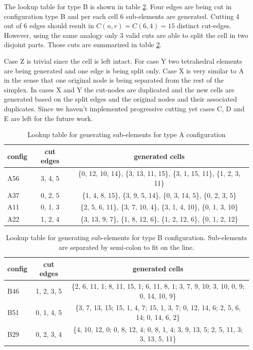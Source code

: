 The lookup table for type B is shown in table \ref{table:lutcutB}. Four edges are being cut in configuration type B and per each cell 6 sub-elements are generated.
Cutting 4 out of 6 edges should result in $C(n, r) = C(6, 4) = 15$ distinct cut-edges. However, using the same analogy only 3 valid cuts are able to split the cell 
in two disjoint parts. Those cuts are summarized in table \ref{table:lutcutB}. 

Case Z is trivial since the cell is left intact. For case Y two tetrahedral elements are being generated and one edge is being split only. Case X is very similar to
A in the sense that one original node is being separated from the rest of the simplex. In cases X and Y the cut-nodes are duplicated and the new cells are generated based
on the split edges and the original nodes and their associated duplicates. Since we haven't implemented progressive cutting yet cases C, D and E are left for the future work.

\begin{table}[H]
\begin{center}
\caption{\label{table:lutcutA}{Lookup table for generating sub-elements for type A configuration}}
  \begin{tabular}{ | l | c | c | }
    \hline    
    config & cut edges & generated cells \\ \hline \hline    
    A56 & 3, 4, 5 & \{0, 12, 10, 14\}, \{3, 13, 11, 15\}, \{3, 1, 15, 11\}, \{1, 2, 3, 11\} \\ \hline
    A37 & 0, 2, 5 & \{1, 4, 8, 15\}, \{3, 9, 5, 14\}, \{0, 3, 14, 5\}, \{0, 2, 3, 5\} \\ \hline
    A11 & 0, 1, 3 & \{2, 5, 6, 11\}, \{3, 7, 10, 4\}, \{3, 1, 4, 10\}, \{0, 1, 3, 10\} \\ \hline
    A22 & 1, 2, 4 & \{3, 13, 9, 7\}, \{1, 8, 12, 6\}, \{1, 2, 12, 6\}, \{0, 1, 2, 12\} \\ \hline
    \hline
  \end{tabular}
\end{center}
\end{table}

\begin{table}[H]
\begin{center}
\caption{\label{table:lutcutB}{Lookup table for generating sub-elements for type B configuration. 
Sub-elements are separated by semi-colon to fit on the line.}}
  \begin{tabular}{ | l | c | c | }
    \hline    
    config & cut edges & generated cells \\ \hline \hline    
    B46 & 1, 2, 3, 5 & \{2, 6, 11, 1; 8, 11, 15, 1; 6, 11, 8, 1; 3, 7, 9, 10; 3, 10, 0, 9; 0, 14, 10, 9\} \\ \hline
    B51 & 0, 1, 4, 5 & \{3, 7, 13, 15; 15, 1, 4, 7; 15, 1, 3, 7; 0, 12, 14, 6; 2, 5, 6, 14; 0, 14, 6, 2\} \\ \hline
    B29 & 0, 2, 3, 4 & \{4, 10, 12, 0; 0, 8, 12, 4; 0, 8, 1, 4; 3, 9, 13, 5; 2, 5, 11, 3; 3, 13, 5, 11\} \\ \hline
    \hline
  \end{tabular}
\end{center}
\end{table}



